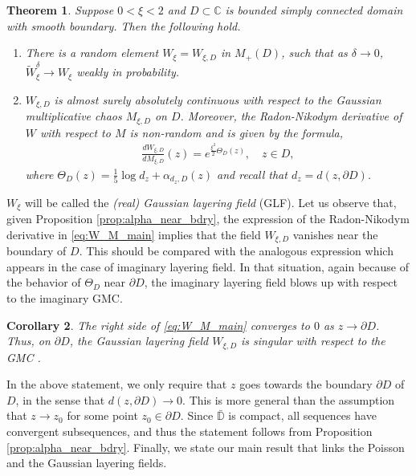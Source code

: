 \documentclass[a4paper, 11pt, reqno]{amsart}
\theoremstyle{definition} \newtheorem{defn}{Definition}[section]
\theoremstyle{remark} \newtheorem{rem}[defn]{Remark}
\theoremstyle{remark} \newtheorem*{rem*}{Remark}
\theoremstyle{plain} \newtheorem{thm}[defn]{Theorem}
\theoremstyle{plain} \newtheorem{lem}[defn]{Lemma}
\theoremstyle{plain} \newtheorem{prop}[defn]{Proposition}
\theoremstyle{plain} \newtheorem{cor}[defn]{Corollary}
\theoremstyle{remark} \newtheorem{exm}[defn]{\textbf{Example}}
\theoremstyle{remark} \newtheorem{exms}[defn]{\textbf{Examples}}
\theoremstyle{remark} \newtheorem*{bl}{}
\numberwithin{equation}{section} %
\newcommand{\C}{\mathbb{C}}
\newcommand{\D}{\mathbb{D}}
\begin{document}
	\begin{thm}\label{thm:main_2}
		 Suppose $0<\xi<2$ and $D\subset \C$ is bounded simply connected domain with smooth boundary. Then the following hold.
		\begin{enumerate}
            \item There is a random element $W_{\xi} = W_{\xi,D}$ in $M_+(D)$, such that as $\delta \to 0$, $\tilde{W}^{\delta}_{\xi} \to W_{\xi}$ weakly in probability. 
            		
			\item $W_{\xi, D}$ is almost surely absolutely continuous with respect to the Gaussian multiplicative chaos $M_{\xi, D}$ on $D$. Moreover, the Radon-Nikodym derivative of $W$ with respect to $M$ is non-random and is given by the formula,
			\begin{align}\label{eq:W_M_main}
				\frac{d W_{\xi, D}}{d M_{\xi, D}}(z)  = e^{\frac{\xi^2}{2}\Theta_D(z)}, \quad z \in D,
			\end{align} 
			where $\Theta_D(z) = \frac{1}{5} \log d_z + \alpha_{ d_z, D}(z)$ and recall that $d_z = d(z, \partial D)$.
		\end{enumerate}			
	\end{thm}	
    
    $W_{\xi}$ will be called the \textit{(real) Gaussian layering field} (GLF).  Let us observe that, given Proposition \ref{prop:alpha_near_bdry}, the expression of the Radon-Nikodym derivative in \eqref{eq:W_M_main} implies that the field $W_{\xi, D}$ vanishes near the boundary of $D$. This should be compared with the analogous expression \cite[eq. (1.6)]{cgpr21} which appears in the case of imaginary layering field. In that situation, again because of the behavior of $\Theta_D$ near $\partial D$, the imaginary layering field blows up with respect to the imaginary GMC.
    \begin{cor}\label{cor:layering_field_bdry}
        The right side of \eqref{eq:W_M_main} converges to $0$ as $z \to \partial D$. Thus,  on $\partial D$, the Gaussian layering field $W_{\xi, D}$ is singular with respect to the GMC .
    \end{cor}
    
     In the above statement, we only require that $z$ goes towards the boundary $\partial D$ of $D$, in the sense that $d(z, \partial D) \to 0$. This is more general than the assumption that $z \to z_0$ for some point $z_0 \in \partial D$. Since $\bar{\D}$ is compact, all sequences have convergent subsequences, and thus the statement follows from Proposition \ref{prop:alpha_near_bdry}. Finally, we state our main result that links the Poisson and the Gaussian  layering fields. 
    
\end{document}
